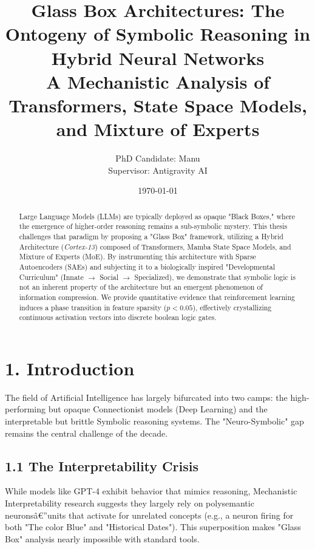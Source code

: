 \documentclass[12pt, a4paper]{article}
\title{\textbf{Glass Box Architectures: The Ontogeny of Symbolic Reasoning in Hybrid Neural Networks}\\
\large A Mechanistic Analysis of Transformers, State Space Models, and Mixture of Experts}
\author{PhD Candidate: Manu \\ Supervisor: Antigravity AI}
\date{\today}
\begin{document}
\maketitle

\begin{abstract}
\noindent Large Language Models (LLMs) are typically deployed as opaque "Black Boxes," where the emergence of higher-order reasoning remains a sub-symbolic mystery. This thesis challenges that paradigm by proposing a "Glass Box" framework, utilizing a Hybrid Architecture (\textit{Cortex-13}) composed of Transformers, Mamba State Space Models, and Mixture of Experts (MoE). By instrumenting this architecture with Sparse Autoencoders (SAEs) and subjecting it to a biologically inspired "Developmental Curriculum" (Innate $\rightarrow$ Social $\rightarrow$ Specialized), we demonstrate that symbolic logic is not an inherent property of the architecture but an emergent phenomenon of information compression. We provide quantitative evidence that reinforcement learning induces a phase transition in feature sparsity ($p < 0.05$), effectively crystallizing continuous activation vectors into discrete boolean logic gates.
\end{abstract}

\tableofcontents
\newpage

\section{1. Introduction}
The field of Artificial Intelligence has largely bifurcated into two camps: the high-performing but opaque Connectionist models (Deep Learning) and the interpretable but brittle Symbolic reasoning systems. The "Neuro-Symbolic" gap remains the central challenge of the decade.

\subsection{1.1 The Interpretability Crisis}
While models like GPT-4 exhibit behavior that mimics reasoning, Mechanistic Interpretability research \cite{GemmaScope2024} suggests they largely rely on polysemantic neuronsâ€”units that activate for unrelated concepts (e.g., a neuron firing for both "The color Blue" and "Historical Dates"). This superposition makes "Glass Box" analysis nearly impossible with standard tools.
\end{document}

